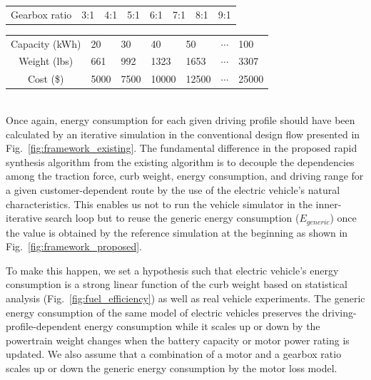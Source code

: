 \documentclass[journal]{IEEEtran}
\begin{document}
{{{{\begin{tabularx}{\linewidth}{|c|Y|Y|Y|Y|Y|Y|Y|}
\hline
{}	 \\ \hline
{}	Gearbox ratio			&3:1		&4:1		&5:1		&6:1	&7:1	&8:1	&9:1	\\ \hline
\end{tabularx}
\vskip 10pt 

\begin{tabularx}{\linewidth}{|c|Y|Y|Y|Y|Y|Y|}
\hline
{}	 \\ \hline
{}	Capacity (kWh)	&20		&30		&40		&50		&$\cdots$	&100	\\ \hline
{}	Weight (lbs)		&661	&992	&1323	&1653	&$\cdots$	&3307	\\ \hline
{}	Cost (\$)			&5000	&7500	&10000	&12500	&$\cdots$	&25000	\\ \hline
\end{tabularx}

}
}}}
~\\

Once again, energy consumption for each given driving profile should have been calculated by an iterative simulation in the conventional design flow presented in Fig.~\ref{fig:framework_existing}. The fundamental difference in the proposed rapid synthesis algorithm from the existing algorithm is to decouple the dependencies among the traction force, curb weight, energy consumption, and driving range for a given customer-dependent route by the use of the electric vehicle’s natural characteristics. This enables us not to run the vehicle simulator in the inner-iterative search loop but to reuse the generic energy consumption ($E_{generic}$) once the value is obtained by the reference simulation at the beginning as shown in Fig.~\ref{fig:framework_proposed}.  

To make this happen, we set a hypothesis such that electric vehicle’s energy consumption is a strong linear function of the curb weight based on statistical analysis (Fig.~\ref{fig:fuel_efficiency}) as well as real vehicle experiments. The generic energy consumption of the same model of electric vehicles preserves the driving-profile-dependent energy consumption while it scales up or down by the powertrain weight changes when the battery capacity or motor power rating is updated. We also assume that a combination of a motor and a gearbox ratio scales up or down the generic energy consumption by the motor loss model. 
\end{document}
